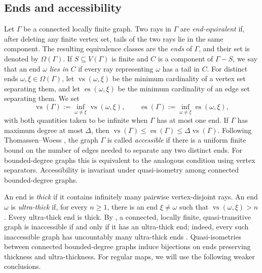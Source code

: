 \documentclass[a4paper]{amsart}
\begin{document}
\subsection{Ends and accessibility}\label{subsec:ends-accessibility}

Let $\Gamma$ be a connected locally finite graph.
Two rays in $\Gamma$ are \emph{end-equivalent} if, after deleting any finite vertex set, tails of the two rays lie in the same component.
The resulting equivalence classes are the \emph{ends} of $\Gamma$, and their set is denoted by $\Omega(\Gamma)$.
If $S\subseteq V(\Gamma)$ is finite and $C$ is a component of $\Gamma-S$, we say that an end $\omega$ \emph{lies in} $C$ if every ray representing $\omega$ has a tail in $C$.
For distinct ends $\omega,\xi\in\Omega(\Gamma)$, let $\operatorname{vs}(\omega,\xi)$ be the minimum cardinality of a vertex set separating them, and let $\operatorname{es}(\omega,\xi)$ be the minimum cardinality of an edge set separating them.
We set
\begin{equation}\label{eq:end-separation-infima}
\operatorname{vs}(\Gamma):=\inf_{\omega\neq\xi}\operatorname{vs}(\omega,\xi),
\qquad
\operatorname{es}(\Gamma):=\inf_{\omega\neq\xi}\operatorname{es}(\omega,\xi),
\end{equation}
with both quantities taken to be infinite when $\Gamma$ has at most one end.
If $\Gamma$ has maximum degree at most $\Delta$, then $\operatorname{vs}(\Gamma)\leq\operatorname{es}(\Gamma)\leq\Delta\operatorname{vs}(\Gamma)$.
Following Thomassen--Woess \cite{thomassen1993vertex}, the graph $\Gamma$ is called \emph{accessible} if there is a uniform finite bound on the number of edges needed to separate any two distinct ends.
For bounded-degree graphs this is equivalent to the analogous condition using vertex separators. Accessibility is invariant under quasi-isometry among connected bounded-degree graphs.

An end is \emph{thick} if it contains infinitely many pairwise vertex-disjoint rays.
An end $\omega$ is \emph{ultra-thick} if, for every $n\geq1$, there is an end $\xi\neq\omega$ such that $\operatorname{vs}(\omega,\xi)>n$.
Every ultra-thick end is thick.
By \cite[Thm.~5.4]{thomassen1993vertex}, a connected, locally finite, quasi-transitive graph is inaccessible if and only if it has an ultra-thick end; indeed, every such inaccessible graph has uncountably many ultra-thick ends \cite[Thm.~1]{moller1996accessibility}.
Quasi-isometries between connected bounded-degree graphs induce bijections on ends preserving thickness and ultra-thickness.
For regular maps, we will use the following weaker conclusions.
\end{document}
